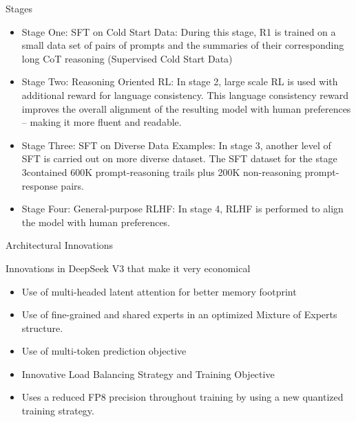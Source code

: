 \begin{frame}[fragile]{ Stages}



    \begin{itemize}
        \item   Stage One: SFT on Cold Start Data:  During this stage, R1 is trained on a small data set of pairs of prompts and the summaries of their corresponding long CoT reasoning (Supervised Cold Start Data) 
		\item Stage Two: Reasoning Oriented RL: In stage 2, large scale RL is used with additional reward for language consistency.  This language consistency reward improves the overall alignment of 
the resulting model with human preferences – making it more fluent 
and readable. 
		\item Stage Three: SFT on Diverse Data Examples:  In stage 3, another level of SFT is carried out on more diverse dataset. The SFT dataset for the stage 3contained 600K prompt-reasoning trails 
plus 200K non-reasoning prompt-response pairs.
		\item Stage Four: General-purpose RLHF:  In stage 4, RLHF is performed to align the model with human 
preferences. 
    \end{itemize}
\end{frame}


\begin{frame}[fragile]{ Architectural Innovations}

Innovations in DeepSeek V3 that make it very economical

    \begin{itemize}
        \item   Use of multi-headed latent attention for better memory footprint
        \item   Use of fine-grained and shared experts in an optimized Mixture of Experts 
structure.
        \item   Use of multi-token prediction objective
        \item   Innovative Load Balancing Strategy and Training Objective
        \item   Uses a reduced FP8 precision throughout training by using a new quantized training 
strategy.
    \end{itemize}
\end{frame}



